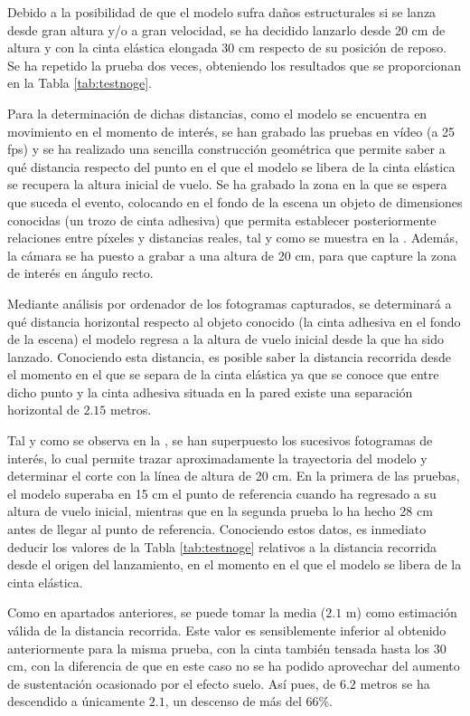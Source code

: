 Debido a la posibilidad de que el modelo sufra daños estructurales si se lanza desde gran altura y/o a gran velocidad, se ha decidido lanzarlo desde 20 cm de altura y con la cinta elástica elongada 30 cm respecto de su posición de reposo. Se ha repetido la prueba dos veces, obteniendo los resultados que se proporcionan en la Tabla \ref{tab:testnoge}.

Para la determinación de dichas distancias, como el modelo se encuentra en movimiento en el momento de interés, se han grabado las pruebas en vídeo (a 25 fps) y se ha realizado una sencilla construcción geométrica que permite saber a qué distancia respecto del punto en el que el modelo se libera de la cinta elástica se recupera la altura inicial de vuelo. Se ha grabado la zona en la que se espera que suceda el evento, colocando en el fondo de la escena un objeto de dimensiones conocidas (un trozo de cinta adhesiva) que permita establecer posteriormente relaciones entre píxeles y distancias reales, tal y como se muestra en la . Además, la cámara se ha puesto a grabar a una altura de 20 cm, para que capture la zona de interés en ángulo recto.

Mediante análisis por ordenador de los fotogramas capturados, se determinará a qué distancia horizontal respecto al objeto conocido (la cinta adhesiva en el fondo de la escena) el modelo regresa a la altura de vuelo inicial desde la que ha sido lanzado. Conociendo esta distancia, es posible saber la distancia recorrida desde el momento en el que se separa de la cinta elástica ya que se conoce que entre dicho punto y la cinta adhesiva situada en la pared existe una separación horizontal de $2.15$ metros.

Tal y como se observa en la , se han superpuesto los sucesivos fotogramas de interés, lo cual permite trazar aproximadamente la trayectoria del modelo y determinar el corte con la línea de altura de 20 cm. En la primera de las pruebas, el modelo superaba en 15 cm el punto de referencia cuando ha regresado a su altura de vuelo inicial, mientras que en la segunda prueba lo ha hecho 28 cm antes de llegar al punto de referencia. Conociendo estos datos, es inmediato deducir los valores de la Tabla \ref{tab:testnoge} relativos a la distancia recorrida desde el origen del lanzamiento, en el momento en el que el modelo se libera de la cinta elástica.

Como en apartados anteriores, se puede tomar la media ($2.1$ m) como estimación válida de la distancia recorrida. Este valor es sensiblemente inferior al obtenido anteriormente para la misma prueba, con la cinta también tensada hasta los 30 cm, con la diferencia de que en este caso no se ha podido aprovechar del aumento de sustentación ocasionado por el efecto suelo. Así pues, de $6.2$ metros se ha descendido a únicamente $2.1$, un descenso de más del 66\%.

